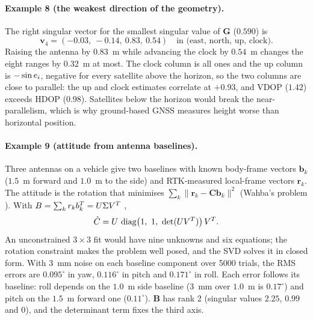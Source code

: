 \documentclass[main.tex]{subfiles}
\begin{document}
\paragraph{Example 8 (the weakest direction of the geometry).}
\label{la:ex8}%
The right singular vector for the smallest singular value of $\bm{G}$
($0.590$) is
\begin{equation*}
\bm{v}_4 = (-0.03,\ -0.14,\ 0.83,\ 0.54)
\quad\text{in (east, north, up, clock).}
\end{equation*}
Raising the antenna by $0.83$~m while advancing the clock by $0.54$~m
changes the eight ranges by $0.32$~m at most.  The clock column is all ones
and the up column is $-\sin e_i$, negative for every satellite above the
horizon, so the two columns are close to parallel: the up and clock
estimates correlate at $+0.93$, and VDOP ($1.42$) exceeds HDOP ($0.98$).
Satellites below the horizon would break the near-parallelism, which is why
ground-based GNSS measures height worse than horizontal position.

\paragraph{Example 9 (attitude from antenna baselines).}
\label{la:ex9}%
Three antennas on a vehicle give two baselines with known body-frame
vectors $\bm{b}_k$ ($1.5$~m forward and $1.0$~m to the side) and
RTK-measured local-frame vectors $\bm{r}_k$.  The attitude is the
rotation that minimises $\sum_k \lVert\bm{r}_k - \bm{C}\bm{b}_k\rVert^2$
(Wahba's problem \cite{wahba1965least}).  With
$B = \sum_k r_kb_k^{T} = U\Sigma V^{T}$
\cite{markley1988attitude},
\begin{equation}
\hat{C} = U\,\operatorname{diag}\bigl(1,\ 1,\
  \det(UV^{T})\bigr)\,V^{T} .
\label{eq:la-wahba}
\end{equation}
An unconstrained $3 \times 3$ fit would have nine unknowns and six
equations; the rotation constraint makes the problem well posed, and the
SVD solves it in closed form.  With $3$~mm noise on each baseline component
over 5000 trials, the RMS errors are $0.095^\circ$ in yaw, $0.116^\circ$ in
pitch and $0.171^\circ$ in roll.  Each error follows its baseline: roll
depends on the $1.0$~m side baseline ($3$~mm over $1.0$~m is $0.17^\circ$)
and pitch on the $1.5$~m forward one ($0.11^\circ$).  $\bm{B}$ has rank 2
(singular values $2.25$, $0.99$ and $0$), and the determinant term fixes
the third axis.
\end{document}
